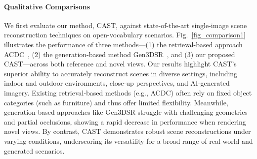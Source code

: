 \paragraph{Qualitative Comparisons}
We first evaluate our method, CAST, against state-of-the-art single-image scene reconstruction techniques on open-vocabulary scenarios. Fig.~\ref{fig_comparison1} illustrates the performance of three methods—(1) the retrieval-based approach ACDC~\cite{dai2024automated}, (2) the generation-based method Gen3DSR~\cite{dogaru2024generalizable}, and (3) our proposed CAST—across both reference and novel views. Our results highlight CAST’s superior ability to accurately reconstruct scenes in diverse settings, including indoor and outdoor environments, close-up perspectives, and AI-generated imagery.
% 
Existing retrieval-based methods (e.g., ACDC) often rely on fixed object categories (such as furniture) and thus offer limited flexibility. Meanwhile, generation-based approaches like Gen3DSR struggle with challenging geometries and partial occlusions, showing a rapid decrease in performance when rendering novel views. By contrast, CAST demonstrates robust scene reconstructions under varying conditions, underscoring its versatility for a broad range of real-world and generated scenarios.


